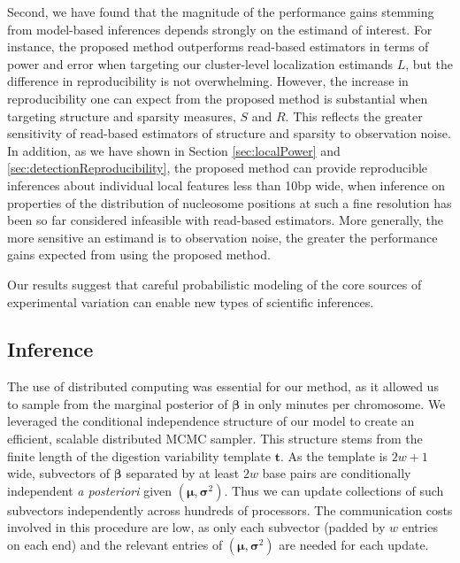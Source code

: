Second, 
 we have found that the magnitude of the performance gains stemming from model-based inferences depends strongly on the estimand of interest.
%
For instance, the proposed method outperforms read-based estimators in terms of power and error when targeting our cluster-level localization estimands $L$, but the difference in reproducibility is not overwhelming.
However, the increase in reproducibility one can expect from the proposed method is substantial when targeting structure and sparsity measures, $S$ and $R$.
This reflects the greater sensitivity of read-based estimators of structure and sparsity to observation noise.
%
In addition, as we have shown in Section \ref{sec:localPower} and \ref{sec:detectionReproducibility}, the proposed method can  provide  reproducible inferences about individual local features less than 10bp wide, when inference on properties of the distribution of nucleosome positions at such a fine resolution has been so far considered infeasible with read-based estimators.
%
More generally, the more sensitive an estimand is to observation noise, the greater the performance gains expected from using the proposed method.

Our results suggest that careful probabilistic modeling of the core sources of experimental variation can enable new types of scientific inferences.

\subsection{Inference}
\label{sec:remarksInference}


The use of distributed computing was essential for our method, as it allowed us to sample from the marginal posterior of $\bm \beta$ in only minutes per chromosome.
We leveraged the conditional independence structure of our model to create an efficient, scalable distributed MCMC sampler.
This structure stems from the finite length of the digestion variability template $\bm t$.
As the template is $2w + 1$ wide, subvectors of $\bm \beta$ separated by at least $2w$ base pairs are conditionally independent \emph{a posteriori} given $(\bm \mu, \bm \sigma^2)$.
Thus we can update collections of such subvectors independently across hundreds of processors.
The communication costs involved in this procedure are low, as only each  subvector (padded by $w$ entries on each end) and the relevant entries of $(\bm \mu, \bm \sigma^2)$ are needed for each update.

